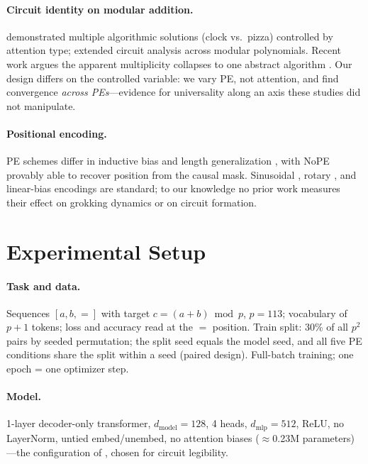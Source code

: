 \documentclass[letterpaper]{article}
\begin{document}
\paragraph{Circuit identity on modular addition.} \citet{zhong2023clock}
demonstrated multiple algorithmic solutions (clock vs.\ pizza) controlled by
attention type; \citet{furuta2024towards} extended circuit analysis across
modular polynomials. Recent work argues the apparent multiplicity collapses to
one abstract algorithm \cite{mccracken2025universal,moisescu2025unifying}. Our
design differs on the controlled variable: we vary PE, not attention, and find
convergence \emph{across PEs}---evidence for universality along an axis these
studies did not manipulate.

\paragraph{Positional encoding.} PE schemes differ in inductive bias and
length generalization \cite{kazemnejad2023impact}, with NoPE provably able to
recover position from the causal mask. Sinusoidal \cite{vaswani2017attention},
rotary \cite{su2021roformer}, and linear-bias \cite{press2021train} encodings
are standard; to our knowledge no prior work measures their effect on grokking
dynamics or on circuit formation.

\section{Experimental Setup}

\paragraph{Task and data.} Sequences $[a, b, {=}]$ with target
$c=(a{+}b) \bmod p$, $p{=}113$; vocabulary of $p{+}1$ tokens; loss and accuracy
read at the ${=}$ position. Train split: 30\% of all $p^2$ pairs by seeded
permutation; the split seed equals the model seed, and all five PE conditions
share the split within a seed (paired design). Full-batch training; one epoch =
one optimizer step.

\paragraph{Model.} 1-layer decoder-only transformer, $d_{\text{model}}{=}128$,
4 heads, $d_{\text{mlp}}{=}512$, ReLU, no LayerNorm, untied embed/unembed, no
attention biases ($\approx$0.23M parameters)---the configuration of
\citet{nanda2023progress}, chosen for circuit legibility.
\end{document}
